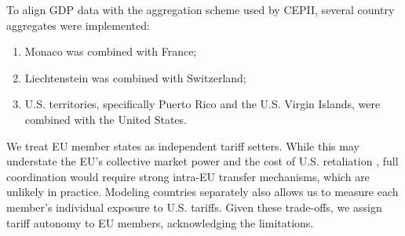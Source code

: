 \documentclass[12pt]{article}
\begin{document}
To align GDP data with the aggregation scheme used by CEPII, several country aggregates were implemented:
\begin{enumerate}
    \item Monaco was combined with France;
    \item Liechtenstein was combined with Switzerland;
    \item U.S. territories, specifically Puerto Rico and the U.S. Virgin Islands, were combined with the United States.
\end{enumerate}

We treat EU member states as independent tariff setters. While this may understate the EU's collective market power and the cost of U.S. retaliation \citep{Lashkaripour_tariff_war}, full coordination would require strong intra-EU transfer mechanisms, which are unlikely in practice. Modeling countries separately also allows us to measure each member's individual exposure to U.S. tariffs. Given these trade-offs, we assign tariff autonomy to EU members, acknowledging the limitations.
\end{document}
